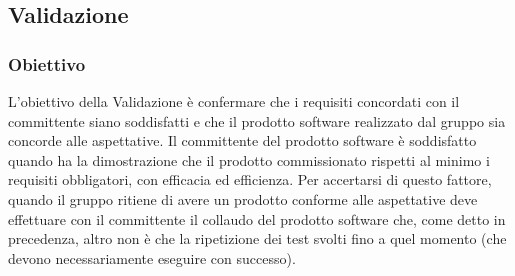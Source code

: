 \subsection{Validazione}
\subsubsection{Obiettivo}
L’obiettivo della Validazione è confermare che i requisiti concordati con il committente siano soddisfatti e che il prodotto software realizzato dal gruppo sia concorde alle aspettative.
Il committente del prodotto software è soddisfatto quando ha la dimostrazione che il prodotto commissionato rispetti al minimo i requisiti obbligatori, con efficacia ed efficienza.
Per accertarsi di questo fattore, quando il gruppo ritiene di avere un prodotto conforme alle aspettative deve effettuare con il committente il collaudo del prodotto software che, come detto in precedenza, altro non è che la ripetizione dei test svolti fino a quel momento (che devono necessariamente eseguire con successo).